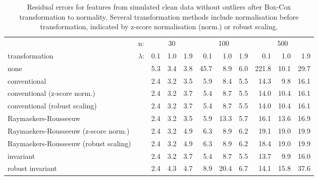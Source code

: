 \documentclass[
  a4paper,
]{article}
\begin{document}
\begin{table}
\begin{center}
\caption{Residual errors for features from simulated clean data without outliers after Box-Cox transformation to normality.
Several transformation methods include normalisation before transformation, indicated by z-score normalisation (norm.) or robust scaling.}
\label{tab:clean-transformation-appendix-residuals-bc}
\small{
\begin{tabular}{l | l r r r r r r r r r}

\toprule
& n: & \multicolumn{3}{c}{30} & \multicolumn{3}{c}{100} & \multicolumn{3}{c}{500} \\
transformation & $\lambda$: & 0.1 & 1.0 & 1.9 & 0.1 & 1.0 & 1.9 & 0.1 & 1.0 & 1.9 \\

\midrule

none                                  & & 5.3 & 3.4 & 3.8 & 45.7 &  8.9 & 6.0 & 221.8 & 10.1 & 29.7 \\
conventional                          & & 2.4 & 3.2 & 3.5 &  5.9 &  8.4 & 5.5 &  14.3 &  9.8 & 16.1 \\
conventional (z-score norm.)          & & 2.4 & 3.2 & 3.7 &  5.4 &  8.7 & 5.5 &  14.0 & 10.4 & 16.1 \\
conventional (robust scaling)         & & 2.4 & 3.2 & 3.7 &  5.4 &  8.7 & 5.5 &  14.0 & 10.4 & 16.1 \\
Raymaekers-Rousseeuw                  & & 2.4 & 3.2 & 3.5 &  5.9 & 13.3 & 5.7 &  16.1 & 13.6 & 16.9 \\
Raymaekers-Rousseeuw (z-score norm.)  & & 2.4 & 3.2 & 4.9 &  6.3 &  8.9 & 6.2 &  19.1 & 19.0 & 19.9 \\
Raymaekers-Rousseeuw (robust scaling) & & 2.4 & 3.2 & 4.9 &  6.3 &  8.9 & 6.2 &  18.4 & 19.0 & 19.9 \\
invariant                             & & 2.4 & 3.2 & 3.7 &  5.4 &  8.7 & 5.5 &  13.7 &  9.9 & 16.0 \\
robust invariant                      & & 2.4 & 4.3 & 4.7 &  8.9 & 20.4 & 6.7 &  14.1 & 15.8 & 37.6 \\

\bottomrule
\end{tabular}
}
\end{center}
\end{table}
\end{document}
